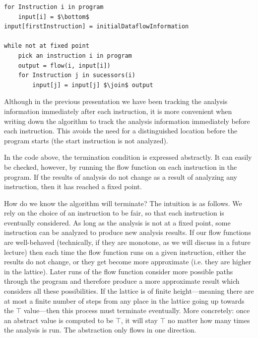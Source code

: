 \documentclass[11pt]{article}
\begin{document}
%

\begin{lstlisting}[mathescape]
for Instruction i in program
    input[i] = $\bottom$
input[firstInstruction] = initialDataflowInformation

while not at fixed point
    pick an instruction i in program
    output = flow(i, input[i])
    for Instruction j in sucessors(i)
        input[j] = input[j] $\join$ output
\end{lstlisting}

Although in the previous presentation we have been tracking the analysis
information immediately after each instruction, it is more convenient when
writing down the algorithm to track the analysis information immediately before
each instruction.  This avoids the need for a distinguished location before the
program starts (the start instruction is not 
analyzed).


In the code above, the termination condition is expressed abstractly.  It can
easily be checked, however, by running the flow function on each instruction in
the program.  If the results of analysis do not change as a result of analyzing
any instruction, then it has reached a fixed point.

How do we know the algorithm will terminate?  The intuition is as follows.  We
rely on the choice of an instruction to be fair, so that each instruction is
eventually considered.  As long as the analysis is not at a fixed point, some
instruction can be analyzed to produce new analysis results.  If our flow
functions are well-behaved (technically, if they are monotone, as we will
discuss in a future lecture) then each time the flow function runs on a given
instruction, either the results do not change, or they get become more approximate
(i.e. they are higher in the lattice).  Later runs of the flow function consider
more possible paths through the program and therefore produce a more approximate
result which considers all these possibilities.  If the lattice is of finite
height---meaning there are at most a finite number of steps from any place in
the lattice going up towards the $\top$ value---then this process must terminate
eventually.  More concretely: once an abstract value is computed to be $\top$,
it will stay $\top$ no matter how many times the analysis is run.  The
abstraction only flows in one direction.
\end{document}
